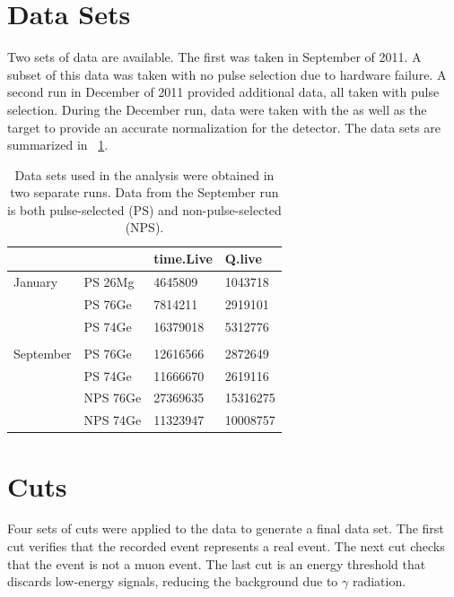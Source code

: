 \section{Data Sets}
Two sets of \reaction data are available.  The first was taken in September of 2011.  A subset of this data was taken with no pulse selection due to hardware failure.  A second run in December of 2011 provided additional data, all taken with pulse selection.  During the December run, data were taken with the \GeTargets as well as the  target to provide an accurate normalization for the detector.  The data sets are summarized in {\tab}~\ref{tab:dataSets}.
\begin{table}[htp]
\centering
\begin{tabular}{llll}
            & & time.Live & Q.live \\
\hline
January     & PS 26Mg & 4645809 & 1043718 \\
	    & PS 76Ge & 7814211 & 2919101 \\
	    & PS 74Ge & 16379018 & 5312776 \\ \\

September   & PS 76Ge & 12616566 & 2872649 \\
	    & PS 74Ge & 11666670 & 2619116 \\
	    & NPS 76Ge & 27369635 & 15316275 \\
	    & NPS 74Ge & 11323947 & 10008757 \\
\end{tabular}
\caption{Data sets used in the analysis were obtained in two separate runs.  Data from the September run is both pulse-selected (PS) and non-pulse-selected (NPS).}
\label{tab:dataSets}
\end{table}

\section{Cuts}
\label{sec:cuts}
Four sets of cuts were applied to the data to generate a final data set.  The first cut verifies that the recorded event represents a real event.  The next cut checks that the event is not a muon event.  The last cut is an energy threshold that discards low-energy signals, reducing the background due to $\gamma$ radiation.

